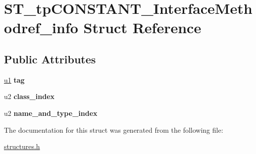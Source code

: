 \hypertarget{structST__tpCONSTANT__InterfaceMethodref__info}{}\section{S\+T\+\_\+tp\+C\+O\+N\+S\+T\+A\+N\+T\+\_\+\+Interface\+Methodref\+\_\+info Struct Reference}
\label{structST__tpCONSTANT__InterfaceMethodref__info}
\subsection*{Public Attributes}
\begin{DoxyCompactItemize}
\item 
\mbox{\label{structST__tpCONSTANT__InterfaceMethodref__info_ae2197358039f30ba91a874675c5ea36c}} 
\mbox{\hyperlink{structures_8h_ad9f4cdb6757615aae2fad89dab3c5470}{u1}} {\bfseries tag}
\item 
\mbox{\label{structST__tpCONSTANT__InterfaceMethodref__info_a5bf51ebb7a9f1fe426796a289cccb65b}} 
u2 {\bfseries class\+\_\+index}
\item 
\mbox{\label{structST__tpCONSTANT__InterfaceMethodref__info_ad617cfd4a6d489d2292af3f80eea6192}} 
u2 {\bfseries name\+\_\+and\+\_\+type\+\_\+index}
\end{DoxyCompactItemize}


The documentation for this struct was generated from the following file\+:\begin{DoxyCompactItemize}
\item 
\mbox{\hyperlink{structures_8h}{structures.\+h}}\end{DoxyCompactItemize}
